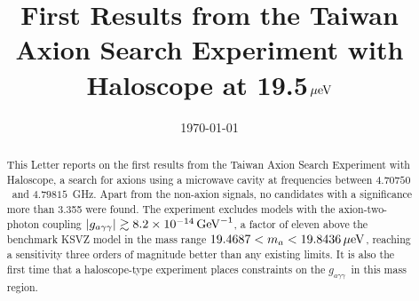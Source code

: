 \documentclass[%
 reprint,prl, %
superscriptaddress,
nobibnotes,
 amsmath,amssymb,
 aps,
]{revtex4-2}
\newcommand{\gagg}{\ensuremath{\left|g_{a\gamma\gamma}\right|}}
\newcommand{\bgagg}{\ensuremath{g_{a\gamma\gamma}}}
\newcommand{\ma}{\ensuremath{m_a}}
\newcommand{\muevcc}{\ensuremath{\,\mu\text{e\hspace{-.08em}V}}}
\newcommand{\GeVinv}{\ensuremath{\,\text{Ge\hspace{-.08em}V}^{-1}}}
\newcommand{\flo}{\ensuremath{4.70750}}
\newcommand{\fhi}{\ensuremath{4.79815}}
\newcommand{\mlo}{\ensuremath{19.4687}}
\newcommand{\mhi}{\ensuremath{19.8436}}
\newcommand{\avelimit}{\ensuremath{8.2\times 10^{-14}}} %
\begin{document}

\title{First Results from the Taiwan Axion Search Experiment with Haloscope at 19.5\muevcc}%



\date{\today}%

\begin{abstract}

 This Letter reports on the first results from the 
Taiwan Axion Search Experiment with Haloscope, a search for axions 
using a microwave cavity at frequencies between \flo\ and \fhi~GHz. 
Apart from the non-axion signals, no candidates with 
a significance more than 3.355 were found. The experiment excludes 
models with the axion-two-photon coupling $\gagg\gtrsim \avelimit\GeVinv$, 
a factor of eleven above the benchmark 
KSVZ model in the mass range $\mlo < \ma < \mhi \muevcc$, reaching 
a sensitivity three orders of magnitude better than any existing limits. 
 It is also the first time that a haloscope-type experiment places 
constraints on the \bgagg\ in this mass region.


\end{abstract}

\maketitle
\end{document}
